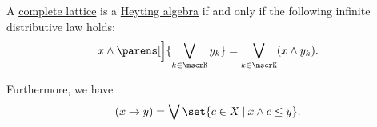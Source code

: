 \begin{proposition}\label{thm:complete_heyting_algebra}
  A \hyperref[def:complete_lattice]{complete lattice} is a \hyperref[def:heyting_algebra]{Heyting algebra} if and only if the following infinite distributive law holds:
  \begin{equation}\label{eq:thm:complete_heyting_algebra/infinite_distributive}
    x \wedge \parens[\Big]{ \bigvee_{k \in \mscrK} y_k } = \bigvee_{k \in \mscrK} (x \wedge y_k).
  \end{equation}

  Furthermore, we have
  \begin{equation}\label{eq:thm:complete_heyting_algebra/relative_pseudocomplement}
    (x \rightarrow y) = \bigvee\set{ c \in X \given x \wedge c \leq y }.
  \end{equation}
\end{proposition}
